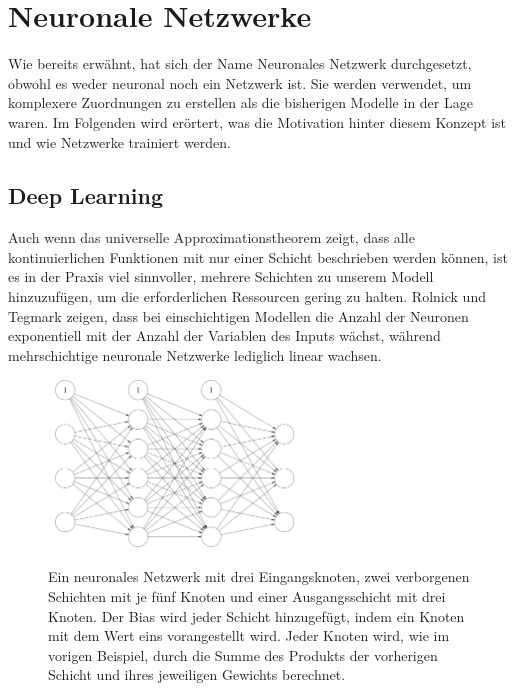 \section{Neuronale Netzwerke} \label{ch:neural_networks}

Wie bereits erwähnt, hat sich der Name Neuronales Netzwerk durchgesetzt, obwohl es weder neuronal noch ein Netzwerk ist.
Sie werden verwendet, um komplexere Zuordnungen zu erstellen als die bisherigen Modelle in der Lage waren.
Im Folgenden wird erörtert, was die Motivation hinter diesem Konzept ist und wie Netzwerke trainiert werden.

\subsection{Deep Learning} \label{ch:deep_learning}

Auch wenn das universelle Approximationstheorem zeigt, dass alle kontinuierlichen Funktionen mit nur einer Schicht beschrieben werden können, ist es in der Praxis viel sinnvoller, mehrere Schichten zu unserem Modell hinzuzufügen, um die erforderlichen Ressourcen gering zu halten.
Rolnick und Tegmark \cite{Rolnick2017} zeigen, dass bei einschichtigen Modellen die Anzahl der Neuronen exponentiell mit der Anzahl der Variablen des Inputs wächst, während mehrschichtige neuronale Netzwerke lediglich linear wachsen.

\begin{figure}
    \centering
    \caption{ Ein neuronales Netzwerk mit drei Eingangsknoten, zwei verborgenen Schichten mit je fünf Knoten und einer Ausgangsschicht mit drei Knoten. Der Bias wird jeder Schicht hinzugefügt, indem ein Knoten mit dem Wert eins vorangestellt wird. Jeder Knoten wird, wie im vorigen Beispiel, durch die Summe des Produkts der vorherigen Schicht und ihres jeweiligen Gewichts berechnet. }
    \includegraphics[width=0.6\textwidth]{images/2_nn_with_bias.png}
    \label{fig:nn}
\end{figure}

